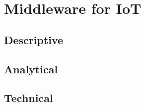 \section{Middleware for IoT}

\subsection{Descriptive}
\subsection{Analytical}
\subsection{Technical}


